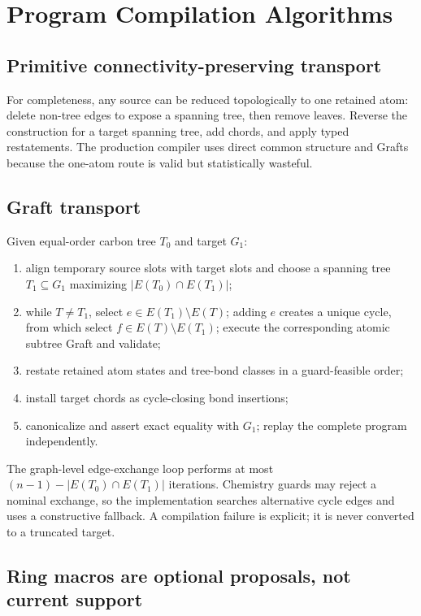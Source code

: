 \documentclass{article}
\theoremstyle{definition}
\theoremstyle{remark}
\begin{document}
\section{Program Compilation Algorithms}\label{app:compiler}

\subsection{Primitive connectivity-preserving transport}

For completeness, any source can be reduced topologically to one retained atom: delete non-tree edges to expose a spanning tree, then remove leaves. Reverse the construction for a target spanning tree, add chords, and apply typed restatements. The production compiler uses direct common structure and Grafts because the one-atom route is valid but statistically wasteful.

\subsection{Graft transport}

Given equal-order carbon tree $T_0$ and target $G_1$:
\begin{enumerate}[leftmargin=*]
    \item align temporary source slots with target slots and choose a spanning tree $T_1\subseteq G_1$ maximizing $|E(T_0)\cap E(T_1)|$;
    \item while $T\neq T_1$, select $e\in E(T_1)\setminus E(T)$; adding $e$ creates a unique cycle, from which select $f\in E(T)\setminus E(T_1)$; execute the corresponding atomic subtree Graft and validate;
    \item restate retained atom states and tree-bond classes in a guard-feasible order;
    \item install target chords as cycle-closing bond insertions;
    \item canonicalize and assert exact equality with $G_1$; replay the complete program independently.
\end{enumerate}
The graph-level edge-exchange loop performs at most $(n-1)-|E(T_0)\cap E(T_1)|$ iterations. Chemistry guards may reject a nominal exchange, so the implementation searches alternative cycle edges and uses a constructive fallback. A compilation failure is explicit; it is never converted to a truncated target.

\subsection{Ring macros are optional proposals, not current support}\label{app:ring-catalog}
\end{document}
